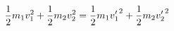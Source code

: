 \documentclass[preview]{standalone}
\begin{document}
\begin{align*}
\special{dvisvgm:raw <g id='unique000'>}\frac{1}{2}m_{1}v_{1}^2+\frac{1}{2}m_{2}v_{2}^2=\frac{1}{2}m_{1}{v_{1}'}^{2}+\frac{1}{2}m_{2}{v_{2}'}^{2}\special{dvisvgm:raw </g>}
\end{align*}
\end{document}

